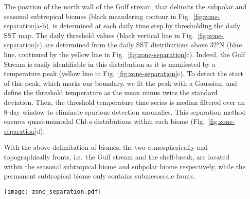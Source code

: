 The position of the north wall of the Gulf stream, that delimits the subpolar and seasonal subtropical biomes (black meandering contour in Fig.~\ref{fig:zone-separation}a-b), is determined at each daily time step by thresholding the daily SST map.
The daily threshold values (black vertical line in Fig.~\ref{fig:zone-separation}c) are determined from the daily SST distributions above 32°N (blue line, continued by the yellow line in Fig.~\ref{fig:zone-separation}c).
Indeed, the Gulf Stream is easily identifiable in this distribution as it is manifested by a temperature peak (yellow line in Fig.~\ref{fig:zone-separation}c).
To detect the start of this peak, which marks our boundary, we fit the peak with a Gaussian, and define the threshold temperature as the mean minus twice the standard deviation.
Then, the threshold temperature time series is median filtered over an 8-day window to eliminate spurious detection anomalies.
This separation method ensures quasi-unimodal Chl\nobreakdash-\emph{a} distributions within each biome (Fig.~\ref{fig:zone-separation}d).

With the above delimitation of biomes, the two atmospherically and topographically fronts, i.e.\ the Gulf stream and the shelf-break, are located within the seasonal subtropical biome and subpolar biome respectively, while the permanent subtropical biome only contains submesoscale fronts.

\begin{figure*}
  \texttt{[image: zone\_separation.pdf]}
  \caption{
    Delimitation of the three biomes in the Gulf stream extension region: the Permanent Subtropical Biome (PSB, south of the dashed line at 32°N), the Seasonal Subtropical Biome (SSB, between 32°N and the meandering Gulf stream northern wall on that day marked with the black contour), and the Subpolar Biome (PB, north of the Gulf stream northern wall).
    (a) SST and (b) Chl\nobreakdash-\emph{a} snapshots on the 22 April 2007 (with data masked by clouds in white), (c) SST and (d) Chl\nobreakdash-\emph{a}  distribution within each biome for the same day (PB:\@blue, SSB:\@yellow, PSB:\@red).
    The black line in (c) shows the SST threshold value detected to delimit the Gulf Stream northern wall (see methods section).
    The x-axis of the distributions correspond to the x-axis scale of the corresponding color bars.
    The red line follows the 1500m isobath.
    Data on the continental shelf (< 1500m) is not considered here and have been masked.
  }%
  \label{fig:zone-separation}
\end{figure*}


